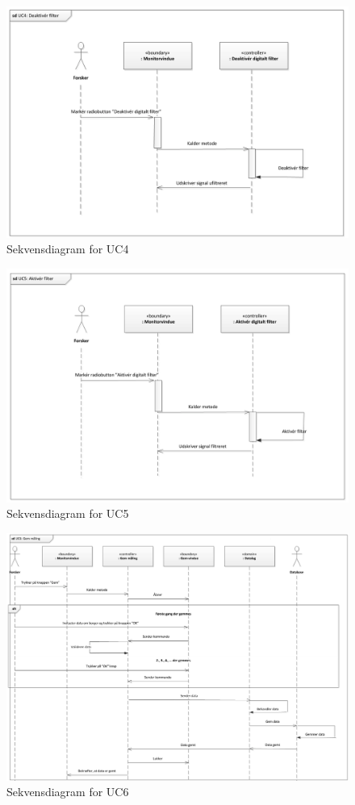 \begin{figure}[H]
	\centering
	\includegraphics[width=1\textwidth]{Figurer/Snip20151102_12}
	\caption{Sekvensdiagram for UC4}
\end{figure}

\begin{figure}[H]
	\centering
	\includegraphics[width=1\textwidth]{Figurer/Snip20151102_13}
	\caption{Sekvensdiagram for UC5}
\end{figure}

\begin{figure}[H]
	\centering
	\includegraphics[width=1\textwidth]{Figurer/Snip20151102_14}
	\caption{Sekvensdiagram for UC6}
\end{figure}

